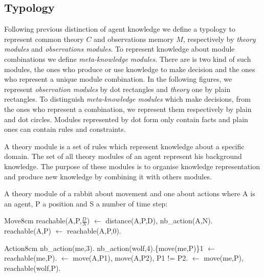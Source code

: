 \documentclass{aamas2012}
\begin{document}
\subsection{Typology}

	Following previous distinction of agent knowledge we define a typology to represent common theory $C$ and observations memory $M$,
	respectively by \emph{theory modules} and \emph{observations modules}.
	To represent knowledge about module combinations we define \emph{meta-knowledge modules}.
	There are is two kind of such modules, the ones who produce or use knowledge to make decision and the ones who represent a unique module combination.
	In the following figures, we represent \emph{observation modules} by dot rectangles and  \emph{theory} one by plain rectangles.
	To distinguish \emph{meta-knowledge modules} which make decisions, from the ones who represent a combination, we represent them respectively by plain and dot circles.
	Modules represented by dot form only contain facts and plain ones can contain rules and constraints.

	\begin{definition}
		A theory module is a set of rules which represent knowledge about a specific domain.
		The set of all theory modules of an agent represent his background knowledge.
		The purpose of these modules is to organise knowledge representation and produce
		new knowledge by combining it with others modules.
	\end{definition}
	
	\begin{example}
		\label{theory_example}
		
		A theory module of a rabbit about movement and one about actions where A is an agent, P a position and S a number of time step:\newline
		\begin{module}{Move}{8cm}
			reachable(A,P,$\frac{D}{N}$) $\leftarrow$ distance(A,P,D), nb\_action(A,N).\newline
			reachable(A,P) $\leftarrow$ reachable(A,P,0).
		\end{module}
		
		\begin{module}{Action}{8cm}
			nb\_action(me,3).\newline
			nb\_action(wolf,4).\{move(me,P)\}1 $\leftarrow$ reachable(me,P).\newline
			$\leftarrow$ move(A,P1), move(A,P2), P1 != P2.\newline
			$\leftarrow$ move(me,P), reachable(wolf,P).
		\end{module}
		
	\end{example}
	
\end{document}
